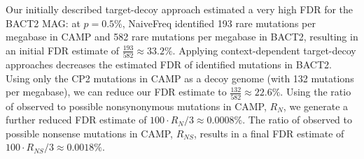 Our initially described target-decoy approach estimated a very high FDR for the BACT2 MAG:
at $p = 0.5\%$, NaiveFreq identified 193 rare mutations per megabase in CAMP and 582 rare mutations per megabase in BACT2, resulting in an initial FDR estimate of $\frac{193}{582} \approx 33.2\%$.
Applying context-dependent target-decoy approaches decreases the estimated FDR of identified mutations in BACT2.
Using only the CP2 mutations in CAMP as a decoy genome (with 132 mutations per megabase), we can reduce our FDR estimate to $\frac{132}{582} \approx 22.6\%$.
Using the ratio of observed to possible nonsynonymous mutations in CAMP, $R_N$, we generate a further reduced FDR estimate of $100 \cdot R_N / 3 \approx 0.0008\%$.
The ratio of observed to possible nonsense mutations in CAMP, $R_{NS}$, results in a final FDR estimate of $100 \cdot R_{NS} / 3 \approx 0.0018\%$.\endinput